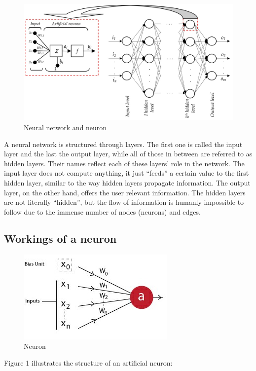 \documentclass{article}
\begin{document}
\begin{figure}[H]
\includegraphics{ANN_Structure}
\caption{Neural network and neuron \cite{Deep_Learning}}
\end{figure}

A neural network is structured through layers. The first one is called the input layer and the last the output layer, while all of those in between are referred to as hidden layers. Their names reflect each of these layers' role in the network. The input layer does not compute anything, it just ``feeds'' a certain value to the first hidden layer, similar to the way hidden layers propagate information. The output layer, on the other hand, offers the user relevant information. The hidden layers are not literally ``hidden'', but the flow of information is humanly impossible to follow due to the immense number of nodes (neurons) and edges.

\subsection{Workings of a neuron}

\begin{figure}[H]
	\includegraphics[scale=0.5]{neuron_s}
	\caption{Neuron \cite{Deep_Learning}}
\end{figure}

Figure 1 illustrates the structure of an artificial neuron:\\
\end{document}
